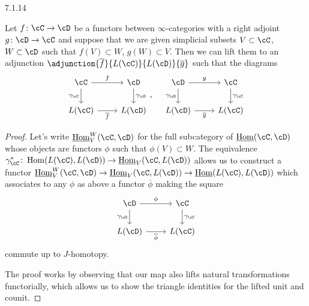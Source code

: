 \begin{prop}\label{7114}
  7.1.14

  Let $f\colon\cC\rightarrow\cD$ be a functors between $\infty$-categories with
  a right adjoint $g\colon\cD\rightarrow\cC$ and suppose that we are given
  simplicial subsets $V\subset\cC$, $W\subset\cD$ such that $f(V)\subset W$,
  $g(W)\subset V$. Then we can lift them to an adjunction
  $\adjunction{\overline{f}}{L(\cC)}{L(\cD)}{\overline{g}}$ such that the
  diagrams
  \[\begin{tikzcd}
    \cC & \cD \\
    {L(\cC)} & {L(\cD)}
    \arrow["{\gamma_\cD}", from=1-2, to=2-2]
    \arrow["{\gamma_\cC}"', from=1-1, to=2-1]
    \arrow["{\overline{f}}"', from=2-1, to=2-2]
    \arrow["f", from=1-1, to=1-2]
  \end{tikzcd},
  \quad
  \begin{tikzcd}
    \cD & \cC \\
    {L(\cD)} & {L(\cC)}
    \arrow["{\gamma_\cC}", from=1-2, to=2-2]
    \arrow["{\gamma_\cD}"', from=1-1, to=2-1]
    \arrow["{\overline{g}}"', from=2-1, to=2-2]
    \arrow["g", from=1-1, to=1-2]
  \end{tikzcd}
  \]
\end{prop}
\begin{proof}
  Let's write $\home_V^W(\cC,\cD)$ for the full subcategory of $\home(\cC,\cD)$
  whose objects are functors $\phi$ such that $\phi(V)\subset W$. The
  equivalence
  $\gamma^*_\cC\colon\Hom(L(\cC),L(\cD))\rightarrow\home_V(\cC,L(\cD))$ allows
  us to construct a functor
  $\home^W_V(\cC,\cD)\rightarrow\home_V(\cC,L(\cD))\rightarrow\home(L(\cC),L(\cD))$
  which associates to any $\phi$ as above a functor $\overline{\phi}$ making the
  square
  \[\begin{tikzcd}
    \cD & \cC \\
    {L(\cD)} & {L(\cC)}
    \arrow["{\gamma_\cC}", from=1-2, to=2-2]
    \arrow["{\gamma_\cD}"', from=1-1, to=2-1]
    \arrow["{\overline{\phi}}"', from=2-1, to=2-2]
    \arrow["\phi", from=1-1, to=1-2]
  \end{tikzcd}\]
  commute up to $J$-homotopy.

  The proof works by observing that our map also lifts natural transformations
  functorially, which allows us to show the triangle identities for the lifted
  unit and counit.
\end{proof}

